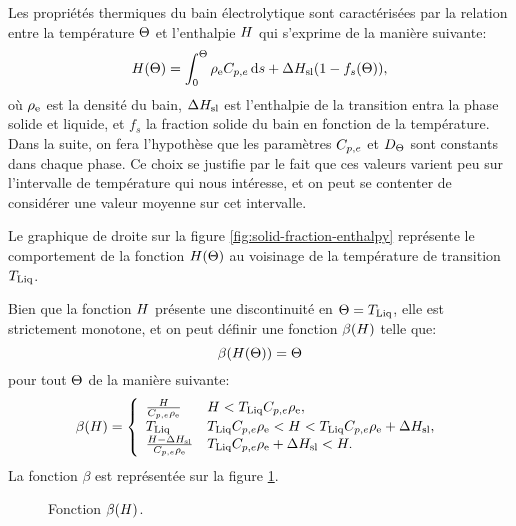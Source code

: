 Les propriétés thermiques du bain électrolytique sont
caractérisées par la relation entre la température $\Theta$ et
l'enthalpie $H$ qui s'exprime de la manière suivante:
\begin{equation}
  \enthalpy(\temperature) = %
    \int_0^\temperature
      \electrolytedensity\electrolytehc\intd{s} %
    + \fusionenthalpy(1 - f_s(\temperature)),
\end{equation}
où $\rho_\mathrm{e}$ est la densité du bain, $\Delta H_\mathrm{sl}$
est l'enthalpie de la transition entra la phase solide et liquide, et
$f_s$ la fraction solide du bain en fonction de la température. Dans
la suite, on fera l'hypothèse que les paramètres $C_{p,e}$
et $D_\Theta$ sont constants dans chaque phase.
Ce choix se justifie par le fait que ces valeurs
varient peu sur l'intervalle de température qui nous intéresse, et
on peut se contenter de considérer une valeur moyenne sur cet intervalle.

Le graphique de droite sur la figure \ref{fig:solid-fraction-enthalpy}
représente le comportement de la fonction $H(\Theta)$ au
voisinage de la température de transition $T_\text{Liq}$.

Bien que la fonction $H$ présente une discontinuité en
$\Theta = T_\text{Liq}$, elle est strictement monotone, et on peut
définir une fonction $\beta(H)$ telle que:
\begin{equation}
\beta(H(\Theta)) = \Theta
\end{equation}
pour tout $\Theta$ de la manière suivante:
\begin{equation}
  \beta(\enthalpy) = \left\{
  \begin{array}{ll}
    \frac{\enthalpy}{\electrolytehc\electrolytedensity} %
      & \enthalpy < \tliq \electrolytehc\electrolytedensity,\\
    \tliq %
      & \tliq \electrolytehc\electrolytedensity < \enthalpy < \tliq \electrolytehc\electrolytedensity + \fusionenthalpy,\\
    \frac{\enthalpy - \fusionenthalpy}{\electrolytehc\electrolytedensity} %
      & \tliq\electrolytehc\electrolytedensity + \fusionenthalpy < \enthalpy.\\
  \end{array}
  \right.
\end{equation}
La fonction $\beta$ est représentée sur la figure \ref{fig:beta}.
\begin{figure}
  \begin{center}
    
    \caption{Fonction $\beta(H)$.}
    \label{fig:beta}
  \end{center}
\end{figure}

